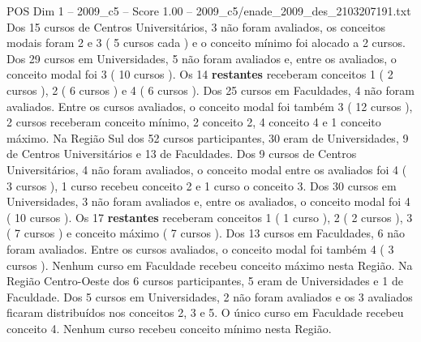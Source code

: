 \begin{textsample}{POS Dim 1 – 2009\_c5 – Score 1.00 – 2009\_c5/enade\_2009\_des\_2103207191.txt}
Dos 15 cursos de Centros Universitários, 3 não foram avaliados, os conceitos modais foram 2 e 3 ( 5 cursos cada ) e o conceito mínimo foi alocado a 2 cursos.
Dos 29 cursos em Universidades, 5 não foram avaliados e, entre os avaliados, o conceito modal foi 3 ( 10 cursos ).
Os 14 \textbf{restantes} receberam conceitos 1 ( 2 cursos ), 2 ( 6 cursos ) e 4 ( 6 cursos ).
Dos 25 cursos em Faculdades, 4 não foram avaliados.
Entre os cursos avaliados, o conceito modal foi também 3 ( 12 cursos ), 2 cursos receberam conceito mínimo, 2 conceito 2, 4 conceito 4 e 1 conceito máximo.
Na Região Sul dos 52 cursos participantes, 30 eram de Universidades, 9 de Centros Universitários e 13 de Faculdades.
Dos 9 cursos de Centros Universitários, 4 não foram avaliados, o conceito modal entre os avaliados foi 4 ( 3 cursos ), 1 curso recebeu conceito 2 e 1 curso o conceito 3.
Dos 30 cursos em Universidades, 3 não foram avaliados e, entre os avaliados, o conceito modal foi 4 ( 10 cursos ).
Os 17 \textbf{restantes} receberam conceitos 1 ( 1 curso ), 2 ( 2 cursos ), 3 ( 7 cursos ) e conceito máximo ( 7 cursos ).
Dos 13 cursos em Faculdades, 6 não foram avaliados.
Entre os cursos avaliados, o conceito modal foi também 4 ( 3 cursos ).
Nenhum curso em Faculdade recebeu conceito máximo nesta Região.
Na Região Centro-Oeste dos 6 cursos participantes, 5 eram de Universidades e 1 de Faculdade.
Dos 5 cursos em Universidades, 2 não foram avaliados e os 3 avaliados ficaram distribuídos nos conceitos 2, 3 e 5.
O único curso em Faculdade recebeu conceito 4.
Nenhum curso recebeu conceito mínimo nesta Região.

\end{textsample}
